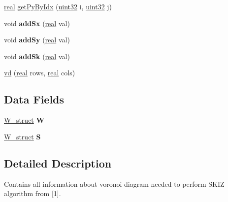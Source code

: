 \begin{DoxyCompactItemize}
\item 
\mbox{\hyperlink{typedefs_8h_a58a0c7cf2501f4492da833421be92547}{real}} \mbox{\hyperlink{classvd_ae6c4ff0f49e07803f5dd13545f6e8f3f}{get\+Py\+By\+Idx}} (\mbox{\hyperlink{typedefs_8h_a8ad23e2333787a214e20a58a284a5a60}{uint32}} i, \mbox{\hyperlink{typedefs_8h_a8ad23e2333787a214e20a58a284a5a60}{uint32}} j)
\item 
\mbox{\label{classvd_aa963b629bc4d1a6b52b0df7efae04da3}} 
void {\bfseries add\+Sx} (\mbox{\hyperlink{typedefs_8h_a58a0c7cf2501f4492da833421be92547}{real}} val)
\item 
\mbox{\label{classvd_ae15b2741f063cc113aaf7a23199a5efe}} 
void {\bfseries add\+Sy} (\mbox{\hyperlink{typedefs_8h_a58a0c7cf2501f4492da833421be92547}{real}} val)
\item 
\mbox{\label{classvd_a62112357c953c7dc77a4e3fb46aeaf9d}} 
void {\bfseries add\+Sk} (\mbox{\hyperlink{typedefs_8h_a58a0c7cf2501f4492da833421be92547}{real}} val)
\item 
\mbox{\hyperlink{classvd_a765c16ee377a2a0f9651d555edd3a158}{vd}} (\mbox{\hyperlink{typedefs_8h_a58a0c7cf2501f4492da833421be92547}{real}} rows, \mbox{\hyperlink{typedefs_8h_a58a0c7cf2501f4492da833421be92547}{real}} cols)
\end{DoxyCompactItemize}
\subsection*{Data Fields}
\begin{DoxyCompactItemize}
\item 
\mbox{\label{classvd_ab23d33e6c11c46ad3302a874a4726542}} 
\mbox{\hyperlink{structW__struct}{W\+\_\+struct}} {\bfseries W}
\item 
\mbox{\label{classvd_a960c80ec5b52938f999f528a5e3cccf1}} 
\mbox{\hyperlink{structW__struct}{W\+\_\+struct}} {\bfseries S}
\end{DoxyCompactItemize}


\subsection{Detailed Description}
Contains all information about voronoi diagram needed to perform S\+K\+IZ algorithm from \mbox{[}1\mbox{]}. 

